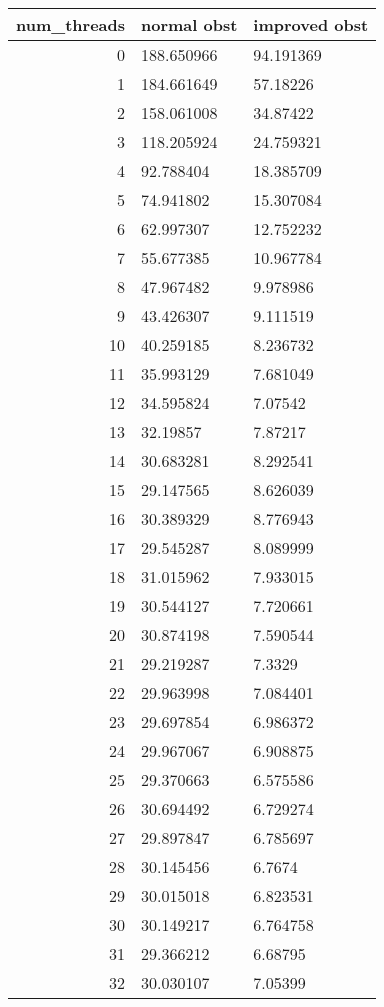 \documentclass[a4paper,12pt]{scrartcl}
\begin{document}
\begin{tabular}{|r|l|l|}
num\_threads & normal obst & improved obst\\  \hline 
0  & 188.650966 & 94.191369  \\ \hline 
1  & 184.661649 & 57.18226   \\ \hline 
2  & 158.061008 & 34.87422   \\ \hline
3  & 118.205924 & 24.759321  \\ \hline
4  & 92.788404 & 18.385709  \\ \hline
5  & 74.941802 & 15.307084  \\ \hline
6  & 62.997307 & 12.752232  \\ \hline
7  & 55.677385 & 10.967784  \\ \hline
8  & 47.967482 & 9.978986   \\ \hline
9  & 43.426307 & 9.111519   \\ \hline
10 & 40.259185 & 8.236732   \\ \hline
11 & 35.993129 & 7.681049   \\ \hline
12 & 34.595824 & 7.07542    \\ \hline
13 & 32.19857 & 7.87217    \\ \hline
14 & 30.683281 & 8.292541   \\ \hline
15 & 29.147565 & 8.626039   \\ \hline
16 & 30.389329 & 8.776943   \\ \hline
17 & 29.545287 & 8.089999   \\ \hline
18 & 31.015962 & 7.933015   \\ \hline
19 & 30.544127 & 7.720661   \\ \hline
20 & 30.874198 & 7.590544   \\ \hline
21 & 29.219287 & 7.3329     \\ \hline
22 & 29.963998 & 7.084401   \\ \hline
23 & 29.697854 & 6.986372   \\ \hline
24 & 29.967067 & 6.908875   \\ \hline
25 & 29.370663 & 6.575586   \\ \hline
26 & 30.694492 & 6.729274   \\ \hline
27 & 29.897847 & 6.785697   \\ \hline
28 & 30.145456 & 6.7674     \\ \hline
29 & 30.015018 & 6.823531   \\ \hline
30 & 30.149217 & 6.764758   \\ \hline
31 & 29.366212 & 6.68795    \\ \hline
32 & 30.030107 & 7.05399    \\ \hline
\end{tabular} 
\end{document}
